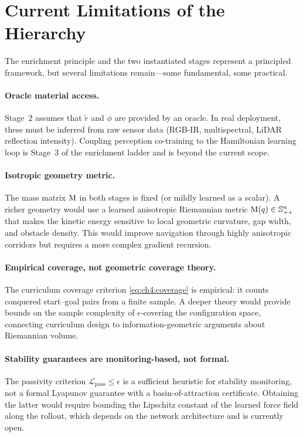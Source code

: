 \section{Current Limitations of the Hierarchy}
\label{sec:ch5:limits}

The enrichment principle and the two instantiated stages represent a
principled framework, but several limitations remain—some fundamental,
some practical.

\paragraph{Oracle material access.}
Stage~2 assumes that $\tilde{r}$ and $\phi$ are provided by an oracle.
In real deployment, these must be inferred from raw sensor data (RGB-IR,
multispectral, LiDAR reflection intensity).
Coupling perception co-training to the Hamiltonian learning loop is
Stage~3 of the enrichment ladder and is beyond the current scope.

\paragraph{Isotropic geometry metric.}
The mass matrix $\mathrm{M}$ in both stages is fixed (or mildly learned as
a scalar).
A richer geometry would use a learned anisotropic Riemannian metric
$\mathrm{M}(q) \in \mathbb{S}^n_{++}$ that makes the kinetic energy
sensitive to local geometric curvature, gap width, and obstacle density.
This would improve navigation through highly anisotropic corridors but
requires a more complex gradient recursion.

\paragraph{Empirical coverage, not geometric coverage theory.}
The curriculum coverage criterion \eqref{eq:ch4:coverage} is empirical:
it counts conquered start–goal pairs from a finite sample.
A deeper theory would provide bounds on the sample complexity of
$\epsilon$-covering the configuration space, connecting curriculum
design to information-geometric arguments about Riemannian volume.

\paragraph{Stability guarantees are monitoring-based, not formal.}
The passivity criterion $\mathcal{L}_{\mathrm{pass}} \leq \epsilon$
is a sufficient heuristic for stability monitoring, not a formal
Lyapunov guarantee with a basin-of-attraction certificate.
Obtaining the latter would require bounding the Lipschitz constant of
the learned force field along the rollout, which depends on the
network architecture and is currently open.

